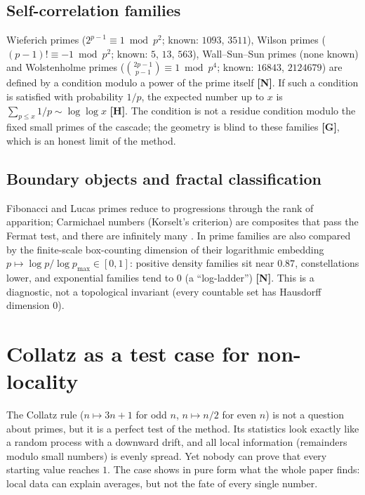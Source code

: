 \documentclass[11pt,a4paper]{article}
\newcommand{\statG}{\textsf{\textbf{[G]}}}
\newcommand{\statN}{\textsf{\textbf{[N]}}}
\newcommand{\statH}{\textsf{\textbf{[H]}}}
\theoremstyle{plain}
\theoremstyle{definition}
\theoremstyle{remark}
\begin{document}
\subsection{Self-correlation families}
Wieferich primes ($2^{p-1}\equiv1\bmod p^2$; known: $1093$, $3511$), Wilson
primes ($(p-1)!\equiv-1\bmod p^2$; known: $5$, $13$, $563$),
Wall--Sun--Sun primes (none known) and Wolstenholme primes
($\binom{2p-1}{p-1}\equiv1\bmod p^4$; known: $16843$, $2124679$) are defined by
a condition modulo a power of the prime itself \statN. If such a condition is
satisfied with probability $1/p$, the expected number up to $x$ is
$\sum_{p\le x}1/p\sim\log\log x$ \statH. The condition is not a residue
condition modulo the fixed small primes of the cascade; the geometry is
blind to these families \statG, which is an honest limit of the method.

\subsection{Boundary objects and fractal classification}
Fibonacci and Lucas primes reduce to progressions through the rank of
apparition; Carmichael numbers (Korselt's criterion) are composites that pass
the Fermat test, and there are infinitely many \cite{AGP}. In \cite{K-atlas}
prime families are also compared by the finite-scale box-counting dimension of
their logarithmic embedding $p\mapsto\log p/\log p_{\max}\in[0,1]$: positive
density families sit near $0.87$, constellations lower, and exponential
families tend to $0$ (a ``log-ladder'') \statN. This is a diagnostic, not a
topological invariant (every countable set has Hausdorff dimension $0$).

\section{Collatz as a test case for non-locality}\label{sec:collatz}

\begin{plainwords}
The Collatz rule ($n\mapsto3n+1$ for odd $n$, $n\mapsto n/2$ for even $n$) is
not a question about primes, but it is a perfect test of the method. Its
statistics look exactly like a random process with a downward drift, and all
local information (remainders modulo small numbers) is evenly spread. Yet
nobody can prove that every starting value reaches $1$. The case shows in
pure form what the whole paper finds: local data can explain averages, but not
the fate of every single number.
\end{plainwords}
\end{document}
